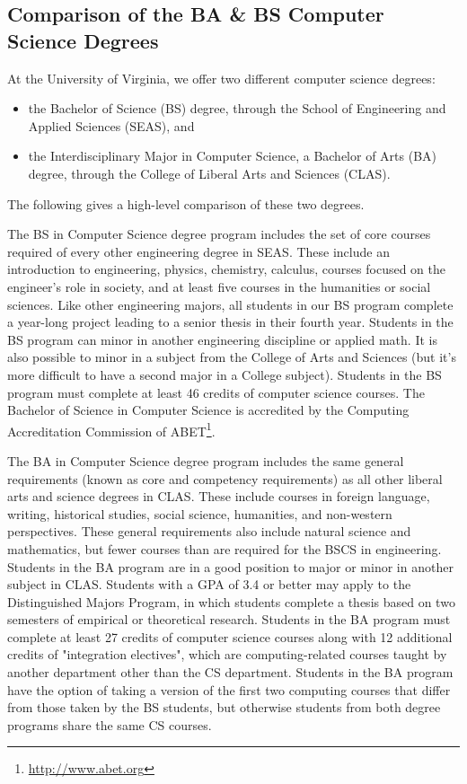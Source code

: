 \documentclass[10pt,letter]{book}
\newenvironment{itemlist}{
\begin{itemize}
\setlength{\itemsep}{0pt}
\setlength{\parskip}{0pt}}
{\end{itemize}}
\newcommand{\myurl}[1]{\footnote{\scriptsize\url{#1}}}
\begin{document}
\subsection{Comparison of the BA \& BS Computer Science
  Degrees}

At the University of Virginia, we offer two different computer science
degrees:

\begin{itemlist}
\item the Bachelor of Science (BS) degree, through the School of
  Engineering and Applied Sciences (SEAS), and
\item the Interdisciplinary Major in Computer Science, a Bachelor of
  Arts (BA) degree, through the College of Liberal Arts and Sciences
  (CLAS).
\end{itemlist}

The following gives a high-level comparison of these two degrees.

The BS in Computer Science degree program includes the set of core
courses required of every other engineering degree in SEAS. These
include an introduction to engineering, physics, chemistry, calculus,
courses focused on the engineer's role in society, and at least five
courses in the humanities or social sciences. Like other engineering
majors, all students in our BS program complete a year-long project
leading to a senior thesis in their fourth year. Students in the BS
program can minor in another engineering discipline or applied
math. It is also possible to minor in a subject from the College of
Arts and Sciences (but it's more difficult to have a second major in a
College subject). Students in the BS program must complete at least 46
credits of computer science courses. The Bachelor of Science in
Computer Science is accredited by the Computing Accreditation
Commission of ABET\myurl{http://www.abet.org}.

The BA in Computer Science degree program includes the same general
requirements (known as core and competency requirements) as all other
liberal arts and science degrees in CLAS. These include courses in
foreign language, writing, historical studies, social science,
humanities, and non-western perspectives. These general requirements
also include natural science and mathematics, but fewer courses than
are required for the BSCS in engineering. Students in the BA program
are in a good position to major or minor in another subject in
CLAS. Students with a GPA of 3.4 or better may apply to the
Distinguished Majors Program, in which students complete a thesis
based on two semesters of empirical or theoretical research. Students
in the BA program must complete at least 27 credits of computer
science courses along with 12 additional credits of "integration
electives", which are computing-related courses taught by another
department other than the CS department. Students in the BA program
have the option of taking a version of the first two computing courses
that differ from those taken by the BS students, but otherwise
students from both degree programs share the same CS courses.
\end{document}

